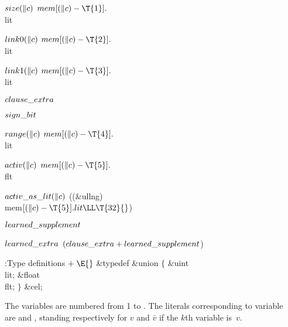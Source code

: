 \Y\B\4\D$\\{size}(\|c)$ \5
$\\{mem}[(\|c)-\T{1}].{}$\\{lit}\par
\B\4\D$\\{link0}(\|c)$ \5
$\\{mem}[(\|c)-\T{2}].{}$\\{lit}\par
\B\4\D$\\{link1}(\|c)$ \5
$\\{mem}[(\|c)-\T{3}].{}$\\{lit}\par
\B\4\D$\\{clause\_extra}$ \5
\par
\B\4\D$\\{sign\_bit}$ \5
\par
\B\4\D$\\{range}(\|c)$ \5
$\\{mem}[(\|c)-\T{4}].{}$\\{lit}\par
\B\4\D$\\{activ}(\|c)$ \5
$\\{mem}[(\|c)-\T{5}].{}$\\{flt}\par
\B\4\D$\\{activ\_as\_lit}(\|c)$ \5
((\&{ullng}) \\{mem}${}[(\|c)-\T{5}].\\{lit}\LL\T{32}{}$)\par
\B\4\D$\\{learned\_supplement}$ \5
\par
\B\4\D$\\{learned\_extra}$ \5
$(\\{clause\_extra}+\\{learned\_supplement}{}$)\par
\Y\B\4:Type definitions\X${}\mathrel+\E{}$\6
\&{typedef} \&{union} ${}\{{}$\1\6
\&{uint} \\{lit};\6
\&{float} \\{flt};\2\6
${}\}{}$ \&{cel};\par
\fi

The variables are numbered from 1 to . The literals corresponding
to variable~ are  and , standing
respectively for $v$
and $\bar v$ if the $k$th variable is~$v$.

